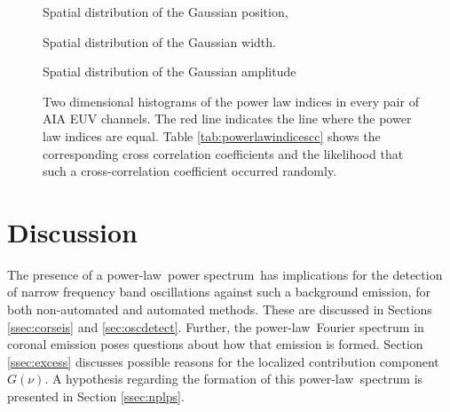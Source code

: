 \documentclass[onecolumn]{emulateapj}
\newcommand{\PS}{power spectrum}
\newcommand{\PL}{power-law}
\begin{document}
\begin{figure}
\label{fig:spatialdistribution:gaussianposition}

\caption{Spatial distribution of the Gaussian position,}
\end{figure}


\begin{figure}
\label{fig:spatialdistribution:gaussianwidth}

\caption{Spatial distribution of the Gaussian width.}
\end{figure}


\begin{figure}
\label{fig:spatialdistribution:gaussianamplitude}

\caption{Spatial distribution of the Gaussian amplitude}
\end{figure}



\begin{figure}
\label{fig:powerlawindicescc}

\caption{Two dimensional histograms of the power law indices in every
  pair of AIA EUV channels.  The red line indicates the line where the
  power law indices are equal. Table \ref{tab:powerlawindicescc} shows
the corresponding cross correlation coefficients and the likelihood
that such a cross-correlation coefficient occurred randomly.}
\end{figure}




\section{Discussion}\label{sec:discuss}
The presence of a \PL\ \PS\ has implications for the detection of
narrow frequency band oscillations against such a background emission,
for both non-automated and automated methods.  These are discussed in
Sections \ref{ssec:corseis} and \ref{sec:oscdetect}.  Further, the
\PL\ Fourier spectrum in coronal emission poses questions about how
that emission is formed.  Section \ref{ssec:excess} discusses possible
reasons for the localized contribution component $G(\nu)$.  A
hypothesis regarding the formation of this \PL\ spectrum is
presented in Section \ref{ssec:nplps}.




\end{document}
